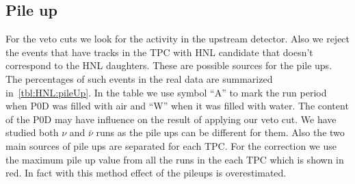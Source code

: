 \documentclass[../main.tex]{subfiles}
\begin{document}
\subsection{Pile up}
\label{sec:HNL:pileup}
For the veto cuts we look for the activity in the upstream detector. Also we reject the events that have tracks in the TPC with HNL candidate that doesn't correspond to the HNL daughters. These are possible sources for the pile ups. The percentages of such events in the real data are summarized in~\autoref{tbl:HNL:pileUp}. In the table we use symbol ``A'' to mark the run period when P0D was filled with air and ``W'' when it was filled with water. The content of the P0D may have influence on the result of applying our veto cut. We have studied both $\nu$ and $\bar{\nu}$ runs as the pile ups can be different for them. Also the two main sources of pile ups are separated for each TPC. For the correction we use the maximum pile up value from all the runs in the each TPC which is shown in red. In fact with this method effect of the pileups is overestimated.
\end{document}
